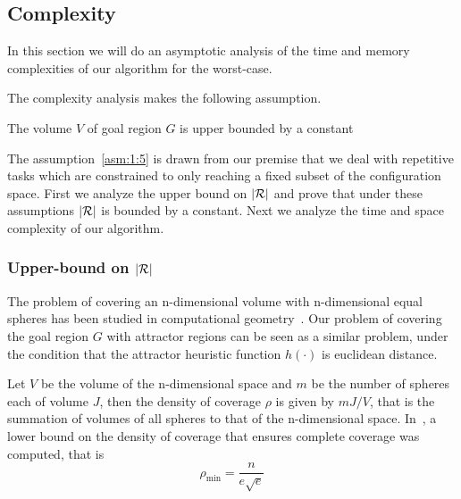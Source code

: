 \documentclass[a4paper]{report}
\begin{document}
\subsection{Complexity}
In this section we will do an asymptotic analysis of the time and memory complexities of our algorithm for the worst-case.

The complexity analysis makes the following assumption.
\vspace{2mm}\begin{assumption}
\label{asm:1:5} The volume $V$ of goal region $G$ is upper bounded by a constant
\end{assumption}

The assumption~\ref{asm:1:5} is drawn from our premise that we deal with repetitive tasks which are constrained to only reaching a fixed subset of the configuration space. First we analyze the upper bound on $|\mathcal{R}|$ and prove that under these assumptions $|\mathcal{R}|$ is bounded by a constant. Next we analyze the time and space complexity of our algorithm.

\subsubsection{Upper-bound on $|\mathcal{R}|$}
The problem of covering an n-dimensional volume with n-dimensional equal spheres has been studied in computational geometry~\cite{cover_spheres1, cover_spheres2}.
Our problem of covering the goal region $G$ with attractor regions can be seen as a similar problem, under the condition that the attractor heuristic function $h(\cdot)$ is euclidean distance.

Let $V$ be the volume of the n-dimensional space and $m$ be the number of spheres each of volume $J$, then the density of coverage $\rho$ is given by $mJ/V$, that is the summation of volumes of all spheres to that of the n-dimensional space.
In~\cite{cover_spheres2}, a lower bound on the density of coverage that ensures complete coverage was computed, that is 
$$
\rho_{\textrm{min}} = \frac{n}{e\sqrt{e}}
$$
\end{document}
